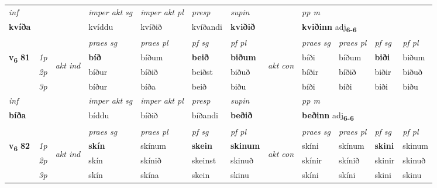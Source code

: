 \begin{longtable}[l]{X>{\footnotesize\itshape}llXXXXlXXXX}
   {\textit{inf}} & &  & \textit{imper akt sg} & \textit{imper akt pl}   & \textit{presp} & \textit{supin}  && \textit{pp m} \\*
  {\textbf{kvíða}} & && kvíddu  & kvíðið   & kvíðandi &  \textbf{kviðið}  && \multicolumn{2}{l}{\textbf{kviðinn} adj\textbf{\textsubscript{6-6}}} \\*

\midrule

 & &   & \textit{praes sg}  & \textit{praes pl}    & \textit{ pf sg} & \textit{pf pl} & & \textit{praes sg}  & \textit{praes pl}    & \textit{pf sg} & \textit{pf pl }  \\ \cmidrule{4-7} \cmidrule{9-12}
 \multirow{2}{*}{{{\textbf{v{\textsubscript{6}}} \Large{\textbf{81}}}}}  & 1p & \multirow{3}{*}{\begin{turn}{90}\textit{akt ind}\end{turn}} & \textbf{bíð} & bíðum & \textbf{beið} & \textbf{biðum} & \multirow{3}{*}{\begin{turn}{90}\textit{akt con}\end{turn}} &bíði & bíðum & \textbf{biði} & biðum\\*
 & 2p &  &  bíður  & bíðið & beiðst & biðuð & & bíðir & bíðið & biðir & biðuð \\*
 & 3p &  & bíður & bíða & beið & biðu & & bíði & bíði& biði & biðu \\*
\cmidrule{4-7} \cmidrule{9-12}

   {\textit{inf}} & &  & \textit{imper akt sg} & \textit{imper akt pl}   & \textit{presp} & \textit{supin}  && \textit{pp m} \\*
  {\textbf{bíða}} & && bíddu  & bíðið   & bíðandi &  \textbf{beðið}  && \multicolumn{2}{l}{\textbf{beðinn} adj\textbf{\textsubscript{6-6}}} \\*

\midrule

 & &   & \textit{praes sg}  & \textit{praes pl}    & \textit{ pf sg} & \textit{pf pl} & & \textit{praes sg}  & \textit{praes pl}    & \textit{pf sg} & \textit{pf pl }  \\ \cmidrule{4-7} \cmidrule{9-12}
 \multirow{2}{*}{{{\textbf{v{\textsubscript{6}}} \Large{\textbf{82}}}}}  & 1p & \multirow{3}{*}{\begin{turn}{90}\textit{akt ind}\end{turn}} & \textbf{skín} & skínum & \textbf{skein} & \textbf{skinum} & \multirow{3}{*}{\begin{turn}{90}\textit{akt con}\end{turn}} &skíni & skínum & \textbf{skini} & skinum\\*
 & 2p &  &  skín  & skínið & skeinst & skinuð & & skínir & skínið & skinir & skinuð \\*
 & 3p &  & skín & skína & skein & skinu & & skíni & skíni& skini & skinu \\*
\cmidrule{4-7} \cmidrule{9-12}


\end{longtable}
